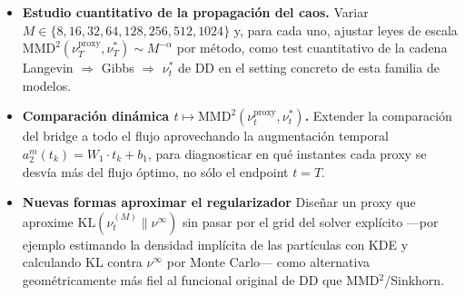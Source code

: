 \documentclass[11pt, a4paper]{article}
\theoremstyle{definition}
\begin{document}
\begin{itemize}
  \item \textbf{Estudio cuantitativo de la propagación del caos.}
        Variar $M\in\{8,16,32,64,128,256,512,1024\}$ y, para cada
        uno, ajustar leyes de escala
        $\mathrm{MMD}^2(\nu_T^{\text{proxy}}, \nu^*_T) \sim M^{-\alpha}$
        por método, como test cuantitativo de la cadena
        Langevin $\Rightarrow$ Gibbs $\Rightarrow$ $\nu^*_t$ de DD
        \cite{HuRenSiskaSzpruch2021,ChenChewi2022} en el setting
        concreto de esta familia de modelos.
  \item \textbf{Comparación dinámica
        $t\mapsto\mathrm{MMD}^2(\nu_t^{\text{proxy}}, \nu_t^*)$.}
        Extender la comparación del bridge a todo el flujo
        aprovechando la augmentación temporal
        $a_2^m(t_k)=W_1\cdot t_k+b_1$, para diagnosticar en qué
        instantes cada proxy se desvía más del flujo óptimo, no
        sólo el endpoint $t=T$.
  \item \textbf{Nuevas formas aproximar el regularizador} Diseñar un proxy que
        aproxime $\mathrm{KL}(\nu_t^{(M)}\|\nu^\infty)$ sin pasar
        por el grid del solver explícito ---por ejemplo estimando
        la densidad implícita de las partículas con KDE y calculando
        KL contra $\nu^\infty$ por Monte Carlo--- como alternativa
        geométricamente más fiel al funcional original de DD que
        MMD$^2$/Sinkhorn.
\end{itemize}
\end{document}
